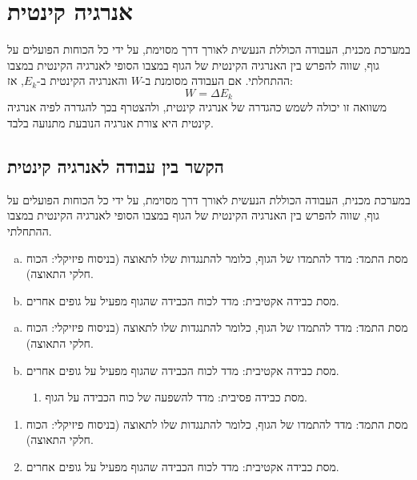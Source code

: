 \documentclass[a4paper]{book}
\begin{document}
\tableofcontents

\setcounter{chapter}{5}
\chapter{אנרגיה קינטית}


במערכת מכנית, העבודה הכוללת הנעשית 
לאורך דרך מסוימת, על ידי כל הכוחות 
הפועלים על גוף, שווה להפרש בין האנרגיה 
הקינטית של הגוף במצבו הסופי לאנרגיה 
הקינטית במצבו ההתחלתי. אם העבודה מסומנת 
ב-$W$ והאנרגיה הקינטית ב-$E_k$, אז:
\begin{equation}
W=\Delta E_k 
\end{equation}
משוואה זו יכולה לשמש כהגדרה של אנרגיה
קינטית, ולהצטרף בכך להגדרה לפיה אנרגיה
קינטית היא צורת אנרגיה הנובעת מתנועה
בלבד.

\section{הקשר בין עבודה לאנרגיה קינטית}

במערכת מכנית, העבודה הכוללת הנעשית
לאורך דרך מסוימת, על ידי כל הכוחות
הפועלים על גוף, שווה להפרש בין האנרגיה
הקינטית של הגוף במצבו הסופי לאנרגיה
הקינטית במצבו ההתחלתי. 

\begin{enumerate}[(a),noitemsep]
  \item מסת התמד: מדד להתמדו של הגוף, כלומר
  להתנגדות שלו לתאוצה (בניסוח פיזיקלי:
  הכוח חלקי התאוצה).

  \item מסת כבידה אקטיבית: מדד לכוח הכבידה
  שהגוף מפעיל על גופים אחרים.
\end{enumerate}

\begin{enumerate}[a.,noitemsep]
  \item מסת התמד: מדד להתמדו של הגוף, כלומר
  להתנגדות שלו לתאוצה (בניסוח פיזיקלי:
  הכוח חלקי התאוצה).

  \item מסת כבידה אקטיבית: מדד לכוח הכבידה
  שהגוף מפעיל על גופים אחרים.
\begin{enumerate}
  \item מסת כבידה פסיבית: מדד להשפעה של כוח הכבידה על הגוף.
\end{enumerate}
\end{enumerate}

\begin{enumerate}[(1), start=4, noitemsep]
  \item מסת התמד: מדד להתמדו של הגוף, כלומר
  להתנגדות שלו לתאוצה (בניסוח פיזיקלי:
  הכוח חלקי התאוצה).

  \item מסת כבידה אקטיבית: מדד לכוח הכבידה
  שהגוף מפעיל על גופים אחרים.
\end{enumerate}
\end{document}
